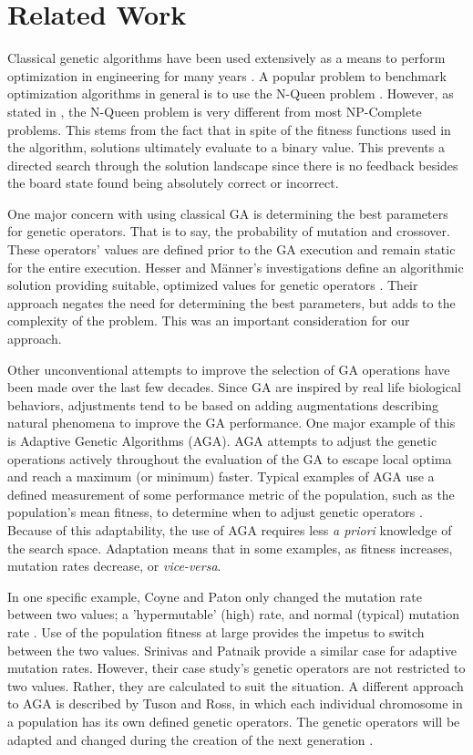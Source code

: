 \documentclass[conference]{IEEEtran}
\begin{document}
\section{Related Work}
Classical genetic algorithms have been used extensively as a means to perform optimization in engineering for many years \cite{goldberg1994genetic,srinivas1994genetic,de1989using}. A popular problem to benchmark optimization algorithms in general is to use the N-Queen problem \cite{homaifar1992queens,crawford1992solving}. However, as stated in \cite{crawford1992solving}, the N-Queen problem is very different from most NP-Complete problems. This stems from the fact that in spite of the fitness functions used in the algorithm, solutions ultimately evaluate to a binary value. This prevents a directed search through the solution landscape since there is no feedback besides the board state found being absolutely correct or incorrect. 

One major concern with using classical GA is determining the best parameters for genetic operators. That is to say, the probability of mutation and crossover. These operators' values are defined prior to the GA execution and remain static for the entire execution. Hesser and M\"{a}nner's investigations define an algorithmic solution providing suitable, optimized values for genetic operators \cite{hesser1991towards}. Their approach negates the need for determining the best parameters, but adds to the complexity of the problem. This was an important consideration for our approach.

Other unconventional attempts to improve the selection of GA operations have been made over the last few decades. Since GA are inspired by real life biological behaviors, adjustments tend to be based on adding augmentations describing natural phenomena to improve the GA performance. One major example of this is Adaptive Genetic Algorithms (AGA). AGA attempts to adjust the genetic operations actively throughout the evaluation of the GA to escape local optima and reach a maximum (or minimum) faster. Typical examples of AGA use a defined measurement of some performance metric of the population, such as the population's mean fitness, to determine when to adjust genetic operators \cite{coyne1994genetic,srinivas1994adaptive}. Because of this adaptability, the use of AGA requires less \emph{a priori} knowledge of the search space. Adaptation means that in some examples, as fitness increases, mutation rates decrease, or \textit{vice-versa}. 

In one specific example, Coyne and Paton only changed the mutation rate between two values; a 'hypermutable' (high) rate, and normal (typical) mutation rate \cite{coyne1994genetic}. Use of the population fitness at large provides the impetus to switch between the two values. Srinivas and Patnaik provide a similar case for adaptive mutation rates. However, their case study's genetic operators are not restricted to two values. Rather, they are calculated to suit the situation. A different approach to AGA is described by Tuson and Ross, in which each individual chromosome in a population has its own defined genetic operators. The genetic operators will be adapted and changed during the creation of the next generation \cite{tuson1998adapting}. 
\end{document}

